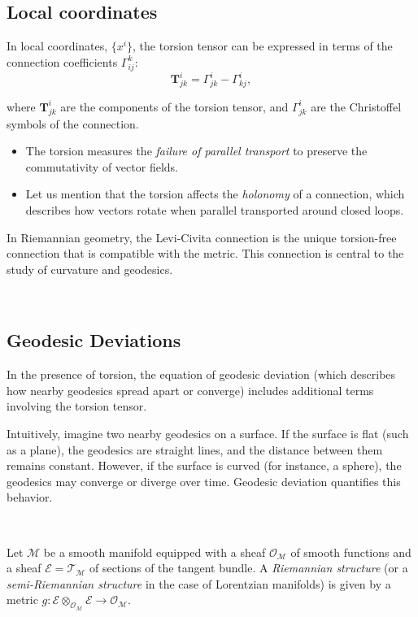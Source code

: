 \subsection{Local coordinates}
In local coordinates, $\{x^i\}$, the torsion tensor can be expressed in terms of the connection coefficients $\Gamma_{ij}^k$:
\[\boldsymbol{T}^i_{jk}=\Gamma_{jk}^i-\Gamma_{kj}^i,\]

where $\boldsymbol{T}^i_{jk}$ are the components of the torsion tensor, and $\Gamma_{jk}^i$ are the Christoffel symbols of the connection.


\begin{itemize}
    \item The torsion measures the \emph{failure of parallel transport} to preserve the commutativity of vector fields. 

\item Let us mention that the torsion affects the \emph{holonomy} of a connection, which describes how vectors rotate when parallel transported around closed loops.
\end{itemize}

In Riemannian geometry, the Levi-Civita connection is the unique torsion-free connection that is compatible with the metric. This connection is central to the study of curvature and geodesics.

\, 

\subsection{Geodesic Deviations}
In the presence of torsion, the equation of geodesic deviation (which describes how nearby geodesics spread apart or converge) includes additional terms involving the torsion tensor. 

Intuitively, imagine two nearby geodesics on a surface. If the surface is flat (such as a plane), the geodesics are straight lines, and the distance between them remains constant. However, if the surface is curved (for instance, a sphere), the geodesics may converge or diverge over time. Geodesic deviation quantifies this behavior.

\, 

Let $\mathcal{M}$ be a smooth manifold equipped with a sheaf $\mathcal{O}_{\mathcal{M}}$ of smooth functions and a sheaf $\mathcal{E} = \mathcal{T}_{\mathcal{M}}$ of sections of the tangent bundle. A \emph{Riemannian structure} (or a \emph{semi-Riemannian structure} in the case of Lorentzian manifolds) is given by a metric $g: \mathcal{E} \otimes_{\mathcal{O}_{\mathcal{M}}} \mathcal{E} \to \mathcal{O}_{\mathcal{M}}$.

